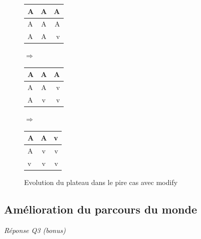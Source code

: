 \documentclass[a4paper,11pt]{article}
\begin{document}
\begin{figure}[!h]
\begin{center}
\begin{tabular}{ | l | c | r | }
	\hline
	A & A & A \\ 
	\hline
	A & A & A \\ 
	\hline
	A & A & \cellcolor{blue!25}v \\
	\hline
\end{tabular}
\hspace{1cm}
{\Huge
\begin{math}
\Rightarrow
\end{math}}
\hspace{1cm}
\begin{tabular}{ | l | c | r | }
	\hline
	A & A & A \\ 
	\hline
	A & A & \cellcolor{blue!25}v \\ 
	\hline
	A & \cellcolor{blue!25}v & \cellcolor{blue!25}v \\
	\hline
\end{tabular}
\hspace{1cm}
{\Huge
\begin{math}
\Rightarrow
\end{math}}
\hspace{1cm}
\begin{tabular}{ | l | c | r | }
	\hline
	A & A & \cellcolor{blue!25}v \\ 
	
	\hline
	A & \cellcolor{blue!25}v & \cellcolor{blue!25}v \\ 
	
	\hline
	
	\cellcolor{blue!25}v & \cellcolor{blue!25}v & \cellcolor{blue!25}v \\
	\hline
\end{tabular}
\end{center}
\caption{Evolution du plateau dans le pire cas avec modify}
\end{figure}

\subsection{Amélioration du parcours du monde}
\emph{Réponse Q3 (bonus)}
\end{document}
